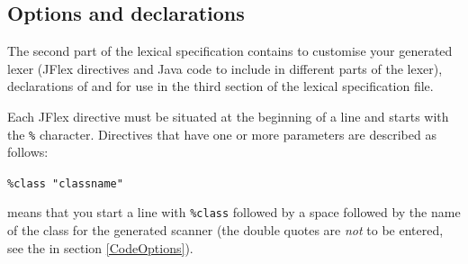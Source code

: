 \documentclass[11pt]{scrartcl}
\begin{document}
\subsection{Options and declarations\label{SpecOptions}}
The second part of the lexical specification contains 
to customise your generated lexer (JFlex directives and Java code to include in
different parts of the lexer), declarations of  and 
 for use in the third section 
 of the lexical specification file.
\label{SpecOptDirectives}

Each JFlex directive must be situated at the beginning of  a line
and starts with the \texttt{\%} character. Directives that have one or
more parameters are described as follows:

\texttt{\%class "classname"}

means that you start a line with \texttt{\%class} followed by a space followed
by the name of the class for the generated scanner (the double quotes are
\emph{not} to be entered, see the  in
section \ref{CodeOptions}).
 
\end{document}
